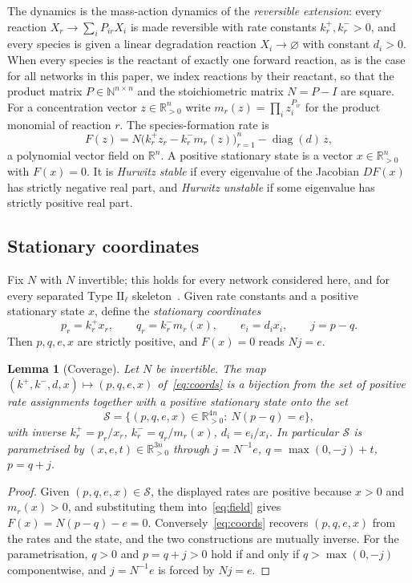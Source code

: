 \documentclass[11pt,a4paper]{article}
\theoremstyle{plain}
\newtheorem{lemma}[theorem]{Lemma}
\theoremstyle{definition}
\theoremstyle{remark}
\numberwithin{equation}{section}
\newcommand{\R}{\mathbb{R}}
\newcommand{\N}{\mathbb{N}}
\newcommand{\diag}{\operatorname{diag}}
\newcommand{\II}{\mathrm{II}}
\begin{document}
The dynamics is the mass-action dynamics of the \emph{reversible extension}: every reaction $X_r\to\sum_iP_{ir}X_i$ is made reversible with rate constants $k_r^+,k_r^->0$, and every species is given a linear degradation reaction $X_i\to\varnothing$ with constant $d_i>0$. When every species is the reactant of exactly one forward reaction, as is the case for all networks in this paper, we index reactions by their reactant, so that the product matrix $P\in\N^{n\times n}$ and the stoichiometric matrix $N=P-I$ are square. For a concentration vector $z\in\R^n_{>0}$ write $m_r(z)=\prod_iz_i^{P_{ir}}$ for the product monomial of reaction $r$. The species-formation rate is
\begin{equation}\label{eq:field}
F(z)=N\bigl(k_r^+z_r-k_r^-m_r(z)\bigr)_{r=1}^n-\diag(d)\,z ,
\end{equation}
a polynomial vector field on $\R^n$. A positive stationary state is a vector $x\in\R^n_{>0}$ with $F(x)=0$. It is \emph{Hurwitz stable} if every eigenvalue of the Jacobian $DF(x)$ has strictly negative real part, and \emph{Hurwitz unstable} if some eigenvalue has strictly positive real part.

\subsection{Stationary coordinates}
Fix $N$ with $N$ invertible; this holds for every network considered here, and for every separated Type $\II_\ell$ skeleton~\cite[Lemma~6.1]{TypeIImixed}. Given rate constants and a positive stationary state $x$, define the \emph{stationary coordinates}
\begin{equation}\label{eq:coords}
p_r=k_r^+x_r,\qquad q_r=k_r^-m_r(x),\qquad e_i=d_ix_i,\qquad j=p-q .
\end{equation}
Then $p,q,e,x$ are strictly positive, and $F(x)=0$ reads $Nj=e$.

\begin{lemma}[Coverage]\label{lem:coverage}
Let $N$ be invertible. The map $(k^+,k^-,d,x)\mapsto(p,q,e,x)$ of~\eqref{eq:coords} is a bijection from the set of positive rate assignments together with a positive stationary state onto the set
\[
\mathcal S=\{(p,q,e,x)\in\R^{4n}_{>0}:\ N(p-q)=e\},
\]
with inverse $k_r^+=p_r/x_r$, $k_r^-=q_r/m_r(x)$, $d_i=e_i/x_i$. In particular $\mathcal S$ is parametrised by $(x,e,t)\in\R^{3n}_{>0}$ through $j=N^{-1}e$, $q=\max(0,-j)+t$, $p=q+j$.
\end{lemma}

\begin{proof}
Given $(p,q,e,x)\in\mathcal S$, the displayed rates are positive because $x>0$ and $m_r(x)>0$, and substituting them into~\eqref{eq:field} gives $F(x)=N(p-q)-e=0$. Conversely~\eqref{eq:coords} recovers $(p,q,e,x)$ from the rates and the state, and the two constructions are mutually inverse. For the parametrisation, $q>0$ and $p=q+j>0$ hold if and only if $q>\max(0,-j)$ componentwise, and $j=N^{-1}e$ is forced by $Nj=e$.
\end{proof}
\end{document}
